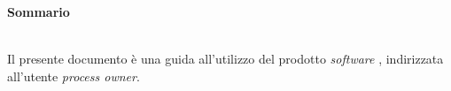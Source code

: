 \noindent\begin{Large}\textbf{Sommario}\end{Large}\\
\noindent Il presente documento è una guida all'utilizzo del prodotto \textit{software} \progetto{}, indirizzata all'utente \textit{process owner}.

